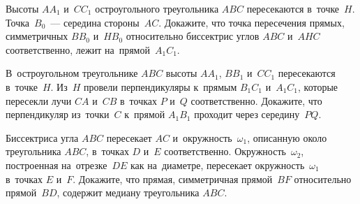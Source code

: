 \begin{problems}
\item
Высоты $AA_{1}$ и~$CC_{1}$ остроугольного треугольника $ABC$ пересекаются
в~точке~$H$.
Точка~$B_{0}$~--- середина стороны~$AC$.
Докажите, что точка пересечения прямых, симметричных $BB_{0}$ и~$HB_{0}$
относительно биссектрис углов $ABC$ и~$AHC$ соответственно, лежит
на~прямой~$A_{1}C_{1}$.

\item
В~остроугольном треугольнике $ABC$ высоты $AA_{1}$, $BB_{1}$ и~$CC_{1}$
пересекаются в~точке~$H$.
Из~$H$ провели перпендикуляры к~прямым $B_{1}C_{1}$ и~$A_{1}C_{1}$, которые
пересекли лучи $CA$ и~$CB$ в~точках $P$ и~$Q$ соответственно.
Докажите, что перпендикуляр из~точки~$C$ к~прямой $A_{1}B_{1}$ проходит через
середину~$PQ$.

\item
Биссектриса угла $ABC$ пересекает $AC$ и~окружность~$\omega_{1}$, описанную
около треугольника $ABC$, в~точках $D$ и~$E$ соответственно.
Окружность~$\omega_{2}$, построенная на~отрезке~$DE$ как на~диаметре,
пересекает окружность~$\omega_{1}$ в~точках $E$ и~$F$.
Докажите, что прямая, симметричная прямой~$BF$ относительно прямой~$BD$,
содержит медиану треугольника $ABC$.



\end{problems}


